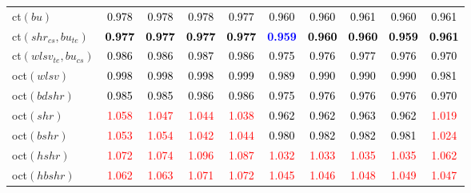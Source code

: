 \begin{tabular}[t]{>{\centering\arraybackslash}m{2.5cm}ccccccccc}
ct$(bu)$ & \textcolor{black}{0.978} & \textcolor{black}{0.978} & \textcolor{black}{0.978} & \textcolor{black}{0.977} & \textcolor{black}{0.960} & \textcolor{black}{0.960} & \textcolor{black}{0.961} & \textcolor{black}{0.960} & \textcolor{black}{0.961}\\
ct$(shr_{cs}, bu_{te})$ & \textcolor{black}{\textbf{0.977}} & \textcolor{black}{\textbf{0.977}} & \textcolor{black}{\textbf{0.977}} & \textcolor{black}{\textbf{0.977}} & \textcolor{blue}{\textbf{0.959}} & \textcolor{black}{\textbf{0.960}} & \textcolor{black}{\textbf{0.960}} & \textcolor{black}{\textbf{0.959}} & \textcolor{black}{\textbf{0.961}}\\
ct$(wlsv_{te}, bu_{cs})$ & \textcolor{black}{0.986} & \textcolor{black}{0.986} & \textcolor{black}{0.987} & \textcolor{black}{0.986} & \textcolor{black}{0.975} & \textcolor{black}{0.976} & \textcolor{black}{0.977} & \textcolor{black}{0.976} & \textcolor{black}{0.970}\\
oct$(wlsv)$ & \textcolor{black}{0.998} & \textcolor{black}{0.998} & \textcolor{black}{0.998} & \textcolor{black}{0.999} & \textcolor{black}{0.989} & \textcolor{black}{0.990} & \textcolor{black}{0.990} & \textcolor{black}{0.990} & \textcolor{black}{0.981}\\
oct$(bdshr)$ & \textcolor{black}{0.985} & \textcolor{black}{0.985} & \textcolor{black}{0.986} & \textcolor{black}{0.986} & \textcolor{black}{0.975} & \textcolor{black}{0.976} & \textcolor{black}{0.976} & \textcolor{black}{0.976} & \textcolor{black}{0.970}\\
oct$(shr)$ & \textcolor{red}{1.058} & \textcolor{red}{1.047} & \textcolor{red}{1.044} & \textcolor{red}{1.038} & \textcolor{black}{0.962} & \textcolor{black}{0.962} & \textcolor{black}{0.963} & \textcolor{black}{0.962} & \textcolor{red}{1.019}\\
oct$(bshr)$ & \textcolor{red}{1.053} & \textcolor{red}{1.054} & \textcolor{red}{1.042} & \textcolor{red}{1.044} & \textcolor{black}{0.980} & \textcolor{black}{0.982} & \textcolor{black}{0.982} & \textcolor{black}{0.981} & \textcolor{red}{1.024}\\
oct$(hshr)$ & \textcolor{red}{1.072} & \textcolor{red}{1.074} & \textcolor{red}{1.096} & \textcolor{red}{1.087} & \textcolor{red}{1.032} & \textcolor{red}{1.033} & \textcolor{red}{1.035} & \textcolor{red}{1.035} & \textcolor{red}{1.062}\\
oct$(hbshr)$ & \textcolor{red}{1.062} & \textcolor{red}{1.063} & \textcolor{red}{1.071} & \textcolor{red}{1.072} & \textcolor{red}{1.045} & \textcolor{red}{1.046} & \textcolor{red}{1.048} & \textcolor{red}{1.049} & \textcolor{red}{1.047}\\

\end{tabular}
